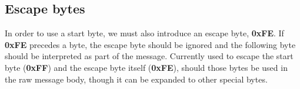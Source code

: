 \documentclass[11pt]{article}
\begin{document}
\subsection{Escape bytes}
\label{subsec:escape}
In order to use a start byte, we must also introduce an escape byte, \textbf{0xFE}. If \textbf{0xFE} precedes a byte, the escape byte should be ignored and the following byte should be interpreted as part of the message. Currently used to escape the start byte (\textbf{0xFF}) and the escape byte itself (\textbf{0xFE}), should those bytes be used in the raw message body, though it can be expanded to other special bytes.
\end{document}
